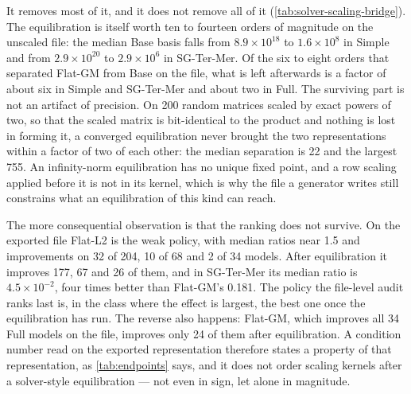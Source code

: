 \documentclass[11pt]{article}
\theoremstyle{definition}
\theoremstyle{remark}
\begin{document}
It removes most of it, and it does not remove all of it
(\cref{tab:solver-scaling-bridge}). The equilibration is itself worth ten to fourteen orders of
magnitude on the unscaled file: the median Base basis falls from $8.9\times10^{18}$ to
$1.6\times10^{8}$ in Simple and from $2.9\times10^{20}$ to $2.9\times10^{6}$ in SG-Ter-Mer. Of
the six to eight orders that separated Flat-GM from Base on the file, what is left afterwards
is a factor of about six in Simple and SG-Ter-Mer and about two in Full. The surviving part is
not an artifact of precision. On 200 random matrices scaled by exact powers of two, so that the
scaled matrix is bit-identical to the product and nothing is lost in forming it, a converged
equilibration never brought the two representations within a factor of two of each other: the
median separation is 22 and the largest 755. An infinity-norm equilibration has no unique fixed
point, and a row scaling applied before it is not in its kernel, which is why the file a
generator writes still constrains what an equilibration of this kind can reach.

The more consequential observation is that the ranking does not survive. On the exported file
Flat-L2 is the weak policy, with median ratios near 1.5 and improvements on 32 of 204, 10 of 68
and 2 of 34 models. After equilibration it improves 177, 67 and 26 of them, and in SG-Ter-Mer
its median ratio is $4.5\times10^{-2}$, four times better than Flat-GM's 0.181. The policy the
file-level audit ranks last is, in the class where the effect is largest, the best one once the
equilibration has run. The reverse also happens: Flat-GM, which improves all 34 Full models on the
file, improves only 24 of them after equilibration. A condition number read on the exported
representation therefore states a property of that representation, as
\cref{tab:endpoints} says, and it does not order scaling kernels after a solver-style
equilibration --- not even in sign, let alone in magnitude.

\begin{table}[tb]
\centering\small
\caption{What survives a solver-style scaling. For each class the first row is the median
$\kappa_1$ of the Base basis; the others give the median per-instance ratio
$\kappa_1(\text{policy})/\kappa_1(\text{Base})$ with, in parentheses, the number of models on
which the policy lowers $\kappa_1$. Columns are the exported file and the same bases after two
and ten passes of power-of-two row-and-column equilibration.}
\label{tab:solver-scaling-bridge}

\end{table}
\end{document}
